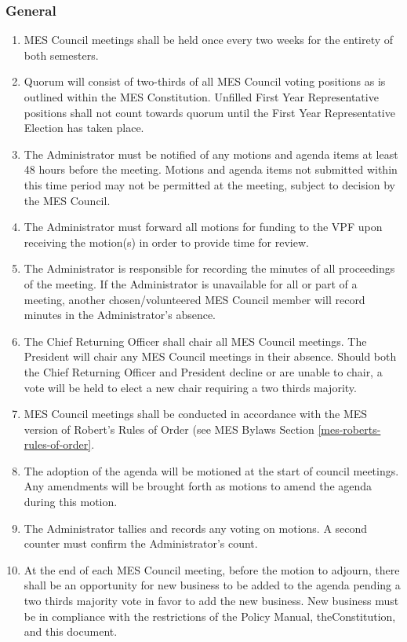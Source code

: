 \subsubsection{General}
\label{meetings-general}

\begin{enumerate}
 \item
  MES Council meetings shall be held once every two weeks for the entirety of both semesters.
 \item
  Quorum will consist of two-thirds of all MES Council voting positions as is outlined within the MES Constitution. Unfilled First Year Representative positions shall not count towards quorum until the First Year Representative Election has taken place.
 \item
  The Administrator must be notified of any motions and agenda items at least 48 hours before the meeting. Motions and agenda items not submitted within this time period may not be permitted at the meeting, subject to decision by the MES Council.
 \item
  The Administrator must forward all motions for funding to the VPF upon receiving the motion(s) in order to provide time for review.
 \item
  The Administrator is responsible for recording the minutes of all proceedings of the meeting. If the Administrator is unavailable for all or part of a meeting, another chosen/volunteered MES Council member will record minutes in the Administrator's absence.
 \item \label{CRO-chair-meetings}
  The Chief Returning Officer shall chair all MES Council meetings. The
  President will chair any MES Council meetings in their absence. Should
  both the Chief Returning Officer and President decline or are unable
  to chair, a vote will be held to elect a new chair requiring a two
  thirds majority.
 \item
  MES Council meetings shall be conducted in accordance with the MES version of Robert's Rules of Order (see MES Bylaws Section \ref{mes-roberts-rules-of-order}.
 \item
  The adoption of the agenda will be motioned at the start of council meetings. Any amendments will be brought forth as motions to amend the agenda during this motion.
 \item
  The Administrator tallies and records any voting on motions. A second counter must confirm the Administrator's count.
 \item
  At the end of each MES Council meeting, before the motion to adjourn, there shall be an opportunity for new business to be added to the agenda pending a two thirds majority vote in favor to add the new business. New business must be in compliance with the restrictions of the Policy Manual, theConstitution, and this document.

\end{enumerate}
